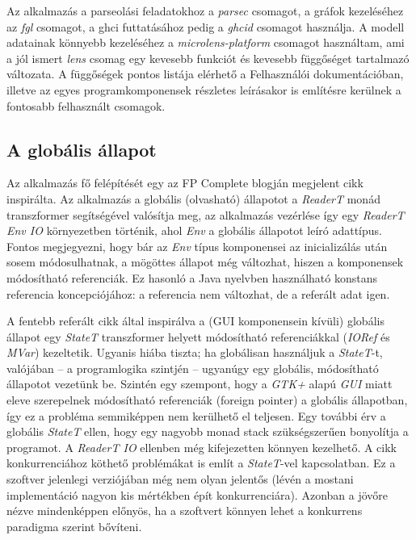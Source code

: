 Az alkalmazás a parseolási feladatokhoz a \textit{parsec} csomagot, a gráfok kezeléséhez az \textit{fgl} csomagot, a ghci futtatásához pedig a \textit{ghcid}  csomagot használja. A modell adatainak könnyebb kezeléséhez a \textit{microlens-platform} csomagot használtam, ami a jól ismert \textit{lens} \cite{lens} csomag egy kevesebb funkciót és kevesebb függőséget tartalmazó változata. A függőségek pontos listája elérhető a Felhasználói dokumentációban, illetve az egyes programkomponensek részletes leírásakor is említésre kerülnek a fontosabb felhasznált csomagok.

\subsection{A globális állapot}

Az alkalmazás fő felépítését egy az FP Complete blogján megjelent cikk \cite{readert} inspirálta. 
Az alkalmazás a globális (olvasható) állapotot a \textit{ReaderT} monád transzformer segítségével valósítja meg, az alkalmazás vezérlése így egy \textit{ReaderT Env IO} környezetben történik, ahol \textit{Env} a globális állapotot leíró adattípus. Fontos megjegyezni, hogy bár az \textit{Env} típus komponensei az inicializálás után sosem módosulhatnak, a mögöttes állapot még változhat, hiszen a komponensek módosítható referenciák. Ez hasonló a Java nyelvben használható konstans referencia koncepciójához: a referencia nem változhat, de a referált adat igen.

A fentebb referált cikk által inspirálva a (GUI komponensein kívüli) globális állapot egy \textit{StateT} transzformer helyett módosítható referenciákkal (\textit{IORef} és \textit{MVar}) kezeltetik. Ugyanis hiába tiszta; ha globálisan használjuk a \textit{StateT}-t, valójában -- a programlogika szintjén -- ugyanúgy egy globális, módosítható állapotot vezetünk be. Szintén egy szempont, hogy a \textit{GTK+} alapú \textit{GUI} miatt eleve szerepelnek módosítható referenciák (foreign pointer) a globális állapotban, így ez a probléma semmiképpen nem kerülhető el teljesen. Egy további érv a globális \textit{StateT} ellen, hogy egy nagyobb monad stack szükségszerűen bonyolítja a programot. A \textit{ReaderT IO} ellenben még kifejezetten könnyen kezelhető. A cikk konkurrenciához köthető problémákat is említ a \textit{StateT}-vel kapcsolatban. Ez a szoftver jelenlegi verziójában még nem olyan jelentős (lévén a mostani implementáció nagyon kis mértékben épít konkurrenciára). Azonban a jövőre nézve mindenképpen előnyös, ha a szoftvert könnyen lehet a konkurrens paradigma szerint bővíteni.

